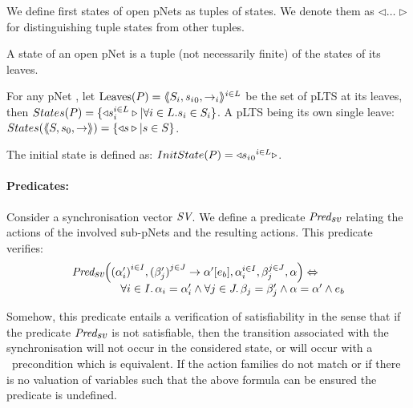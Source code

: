 \documentclass{lncs/llncs}
\begin{document}
We define first states of open pNets as tuples of states. We denote them
 as $\triangleleft\ldots\triangleright$ for distinguishing tuple 
states from other tuples.
\begin{definition}\label{def-states}
  A state of an open pNet is a tuple (not necessarily finite) of the
  states of its leaves.

  For any pNet \pNet, let $\operatorname{Leaves}(P) = \langle\hspace{-0.58ex}\langle S_i,{s_i}_0, \to_i\rangle\hspace{-0.58ex}\rangle^{i \in L}$ be 
  the set of pLTS at its leaves,
  then $States(P) = \{\triangleleft s_i^{i\in L}
  \triangleright| \forall i\in L. s_i \in S_i\}$.
A pLTS being its own single leave:
  $States(\langle\hspace{-0.58ex}\langle S,s_0, \to\rangle\hspace{-0.58ex}\rangle) = \{\triangleleft s \triangleright| s \in S\}$.

The initial state is defined as:
$InitState(P) = \triangleleft {{s_i}_0}^{i\in L}  \triangleright$.
\end{definition}




\paragraph{Predicates:}
Consider a synchronisation vector $\symb{SV}$. We 
define a
predicate $\Predsv$ relating
the actions of the involved sub-pNets and the resulting actions. This predicate verifies:
\[\begin{array}{l}\Predsv \Big(\SV{{(\alpha'_i)}^{i\in I}, {(\beta'_j)}^{j\in J}} 
{\alpha'} 
{e_b}, \alpha_i^{i\in I}, \beta_j^{j\in J}, \alpha\Big)\Leftrightarrow \\~\qquad\qquad%
%
\forall i\in I.\, \alpha_i=\alpha'_i\land \forall j \in J.\, \beta_j=\beta'_j \land 
\alpha=\alpha' 
\land e_b
\end{array} 
\]

Somehow, this predicate entails a verification of satisfiability in the sense that if the 
predicate $\Predsv$ is not satisfiable, then the transition associated with the 
synchronisation will not occur in the considered state, or will occur with a \False\ precondition which is equivalent.
If the action families do not match or if there is no valuation of
variables such that the above formula can be ensured the predicate is undefined.
\end{document}
